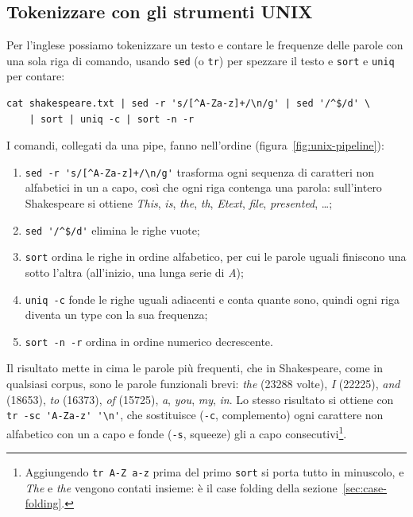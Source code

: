 \subsection{Tokenizzare con gli strumenti UNIX}
Per l'inglese possiamo tokenizzare un testo e contare le frequenze delle parole con una sola riga di comando, usando \texttt{sed} (o \texttt{tr}) per spezzare il testo e \texttt{sort} e \texttt{uniq} per contare:
\begin{lstlisting}[style=sh]
cat shakespeare.txt | sed -r 's/[^A-Za-z]+/\n/g' | sed '/^$/d' \
    | sort | uniq -c | sort -n -r
\end{lstlisting}
I comandi, collegati da una pipe, fanno nell'ordine (figura~\ref{fig:unix-pipeline}):
\begin{enumerate}
    \item \verb|sed -r 's/[^A-Za-z]+/\n/g'| trasforma ogni sequenza di caratteri non alfabetici in un a capo, così che ogni riga contenga una parola: sull'intero Shakespeare si ottiene \textit{This}, \textit{is}, \textit{the}, \textit{th}, \textit{Etext}, \textit{file}, \textit{presented}, \dots;
    \item \verb|sed '/^$/d'| elimina le righe vuote;
    \item \verb|sort| ordina le righe in ordine alfabetico, per cui le parole uguali finiscono una sotto l'altra (all'inizio, una lunga serie di \textit{A});
    \item \verb|uniq -c| fonde le righe uguali adiacenti e conta quante sono, quindi ogni riga diventa un type con la sua frequenza;
    \item \verb|sort -n -r| ordina in ordine numerico decrescente.
\end{enumerate}
Il risultato mette in cima le parole più frequenti, che in Shakespeare, come in qualsiasi corpus, sono le parole funzionali brevi: \textit{the} (23288 volte), \textit{I} (22225), \textit{and} (18653), \textit{to} (16373), \textit{of} (15725), \textit{a}, \textit{you}, \textit{my}, \textit{in}. Lo stesso risultato si ottiene con \verb|tr -sc 'A-Za-z' '\n'|, che sostituisce (\texttt{-c}, complemento) ogni carattere non alfabetico con un a capo e fonde (\texttt{-s}, squeeze) gli a capo consecutivi\footnote{Aggiungendo \texttt{tr A-Z a-z} prima del primo \texttt{sort} si porta tutto in minuscolo, e \textit{The} e \textit{the} vengono contati insieme: è il case folding della sezione~\ref{sec:case-folding}.}.

